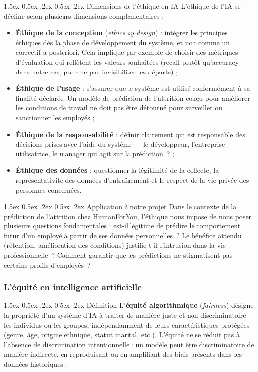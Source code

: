 \documentclass[12pt,a4paper]{article}
\makeatletter
\renewcommand\paragraph{\@startsection{paragraph}{4}{\z@}%
  {1.5ex \@plus 0.5ex \@minus .2ex}%
  {0.5ex \@plus .2ex}%
  {\normalfont\normalsize\bfseries}}
\makeatother
\begin{document}
\paragraph{Dimensions de l'éthique en IA}
L'éthique de l'IA se décline selon plusieurs dimensions complémentaires :
\begin{itemize}
    \item \textbf{Éthique de la conception} (\textit{ethics by design}) : intégrer les principes éthiques dès la phase de développement du système, et non comme un correctif a posteriori. Cela implique par exemple de choisir des métriques d'évaluation qui reflètent les valeurs souhaitées (recall plutôt qu'accuracy dans notre cas, pour ne pas invisibiliser les départs) ;
    \item \textbf{Éthique de l'usage} : s'assurer que le système est utilisé conformément à sa finalité déclarée. Un modèle de prédiction de l'attrition conçu pour améliorer les conditions de travail ne doit pas être détourné pour surveiller ou sanctionner les employés ;
    \item \textbf{Éthique de la responsabilité} : définir clairement qui est responsable des décisions prises avec l'aide du système --- le développeur, l'entreprise utilisatrice, le manager qui agit sur la prédiction~? ;
    \item \textbf{Éthique des données} : questionner la légitimité de la collecte, la représentativité des données d'entraînement et le respect de la vie privée des personnes concernées.
\end{itemize}

\paragraph{Application à notre projet}
Dans le contexte de la prédiction de l'attrition chez HumanForYou, l'éthique nous impose de nous poser plusieurs questions fondamentales : est-il légitime de prédire le comportement futur d'un employé à partir de ses données personnelles~? Le bénéfice attendu (rétention, amélioration des conditions) justifie-t-il l'intrusion dans la vie professionnelle~? Comment garantir que les prédictions ne stigmatisent pas certains profils d'employés~?

\subsubsection{L'équité en intelligence artificielle}

\paragraph{Définition}
L'\textbf{équité algorithmique} (\textit{fairness}) désigne la propriété d'un système d'IA à traiter de manière juste et non discriminatoire les individus ou les groupes, indépendamment de leurs caractéristiques protégées (genre, âge, origine ethnique, statut marital, etc.). L'équité ne se réduit pas à l'absence de discrimination intentionnelle : un modèle peut être discriminatoire de manière indirecte, en reproduisant ou en amplifiant des biais présents dans les données historiques \cite{quantmetry}.
\end{document}

